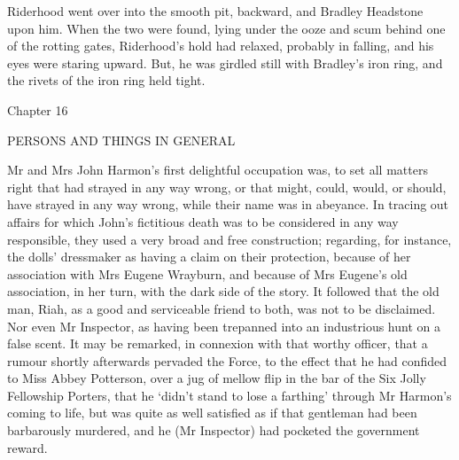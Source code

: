 Riderhood went over into the smooth pit, backward, and Bradley Headstone
upon him. When the two were found, lying under the ooze and scum behind
one of the rotting gates, Riderhood’s hold had relaxed, probably in
falling, and his eyes were staring upward. But, he was girdled still
with Bradley’s iron ring, and the rivets of the iron ring held tight.



Chapter 16

PERSONS AND THINGS IN GENERAL


Mr and Mrs John Harmon’s first delightful occupation was, to set all
matters right that had strayed in any way wrong, or that might, could,
would, or should, have strayed in any way wrong, while their name was in
abeyance. In tracing out affairs for which John’s fictitious death was
to be considered in any way responsible, they used a very broad and free
construction; regarding, for instance, the dolls’ dressmaker as having
a claim on their protection, because of her association with Mrs Eugene
Wrayburn, and because of Mrs Eugene’s old association, in her turn, with
the dark side of the story. It followed that the old man, Riah, as a
good and serviceable friend to both, was not to be disclaimed. Nor even
Mr Inspector, as having been trepanned into an industrious hunt on a
false scent. It may be remarked, in connexion with that worthy officer,
that a rumour shortly afterwards pervaded the Force, to the effect that
he had confided to Miss Abbey Potterson, over a jug of mellow flip in
the bar of the Six Jolly Fellowship Porters, that he ‘didn’t stand to
lose a farthing’ through Mr Harmon’s coming to life, but was quite as
well satisfied as if that gentleman had been barbarously murdered, and
he (Mr Inspector) had pocketed the government reward.

